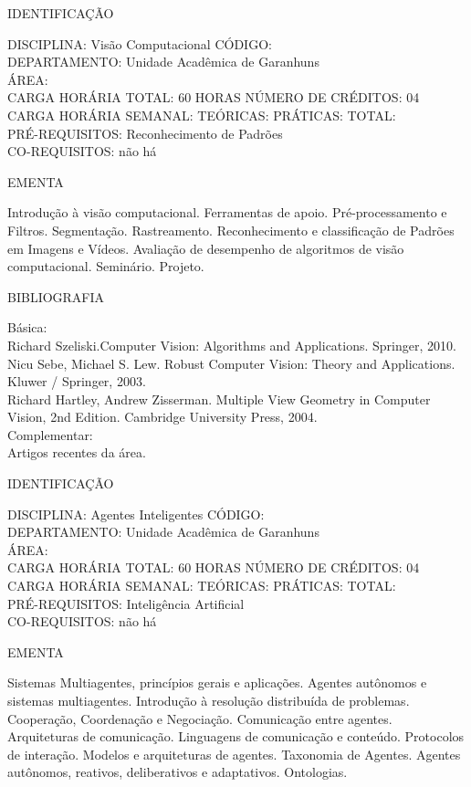 \documentclass[
	12pt,				%
	openright,			%
  oneside,     %
	a4paper,			%
	english,			%
	french,				%
	spanish,			%
	brazil				%
	]{abntex2}
\begin{document}
\begin{apendicesenv}
\newpage IDENTIFICAÇÃO

DISCIPLINA: Visão Computacional CÓDIGO:\\ 
DEPARTAMENTO: Unidade Acadêmica de Garanhuns\\
ÁREA: \\
CARGA HORÁRIA TOTAL: 60 HORAS NÚMERO DE CRÉDITOS: 04\\
CARGA HORÁRIA SEMANAL: TEÓRICAS: PRÁTICAS: TOTAL: \\
PRÉ-REQUISITOS: Reconhecimento de Padrões\\
CO-REQUISITOS: não há

EMENTA 

Introdução à visão computacional. Ferramentas de apoio.
Pré-processamento e Filtros. Segmentação. Rastreamento. Reconhecimento
e classificação de Padrões em Imagens e Vídeos. Avaliação de desempenho
de algoritmos de visão computacional. Seminário. Projeto.

BIBLIOGRAFIA 

Básica:\\
Richard Szeliski.Computer Vision: Algorithms and Applications. Springer,
2010.\\
Nicu Sebe, Michael S. Lew. Robust Computer Vision: Theory and
Applications. Kluwer / Springer, 2003.\\
Richard Hartley, Andrew Zisserman. Multiple View Geometry in Computer
Vision, 2nd Edition. Cambridge University Press, 2004.\\
Complementar:\\
Artigos recentes da área.

\newpage IDENTIFICAÇÃO

DISCIPLINA: Agentes Inteligentes CÓDIGO:\\ 
DEPARTAMENTO: Unidade Acadêmica de Garanhuns\\
ÁREA: \\
CARGA HORÁRIA TOTAL: 60 HORAS NÚMERO DE CRÉDITOS: 04\\
CARGA HORÁRIA SEMANAL: TEÓRICAS: PRÁTICAS: TOTAL: \\
PRÉ-REQUISITOS: Inteligência Artificial\\
CO-REQUISITOS: não há

EMENTA 

Sistemas Multiagentes, princípios gerais e aplicações. Agentes autônomos
e sistemas multiagentes. Introdução à resolução distribuída de
problemas. Cooperação, Coordenação e Negociação. Comunicação entre
agentes. Arquiteturas de comunicação. Linguagens de comunicação e
conteúdo. Protocolos de interação. Modelos e arquiteturas de agentes.
Taxonomia de Agentes. Agentes autônomos, reativos, deliberativos e
adaptativos. Ontologias.


\end{apendicesenv}
\end{document}
